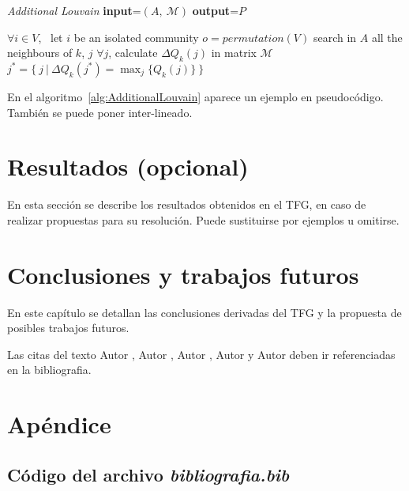 \documentclass[twoside]{tfg-urjc}
\begin{document}
\begin{algorithm}[t]
  \caption{\textit{Additional Louvain} \textbf{input}=$\left(A, \ \mathcal{M}\right)$ \textbf{output}=$P$}
  \begin{algorithmic}[1]
    \STATE $\forall i \in V$, \ let $i$ be an isolated community
    \STATE $o=permutation(V)$
    \STATE search in $A$ all the neighbours of $k$, $j$
    \STATE $\forall j$, calculate $\Delta Q_k(j)$ in matrix $\mathcal{M}$
    \STATE $j^*=\{ \ j \ | \ \Delta Q_k(j^*)=\max_j\{Q_k(j)\} \ \}$
    \ELSE
    \ENDIF
    \ENDFOR
  \end{algorithmic}
  \label{alg:AdditionalLouvain}
\end{algorithm}


En el algoritmo~\ref{alg:AdditionalLouvain} aparece un ejemplo en
pseudocódigo.  También se puede poner  inter-lineado.


\chapter{Resultados (opcional)}
\label{sec:resulObtenidos}


En esta sección se describe los resultados obtenidos en el TFG, en
caso de realizar propuestas para su resolución. Puede sustituirse por
ejemplos u omitirse.


\chapter{Conclusiones y trabajos futuros}

En este capítulo se detallan las conclusiones derivadas del TFG y la
propuesta de posibles trabajos futuros.

Las citas del texto Autor \cite{giaquinta}, Autor \cite{fortune},
Autor \cite{fortuneB}, Autor \cite{mitchell} y Autor \cite{morrey}
deben ir referenciadas en la bibliografia.



\cleardoublepage
{}
{}

\printbibliography


\cleardoublepage
\appendix

\chapter{Apéndice}


\section{Código del archivo \emph{bibliografia.bib}}
\label{app:bib}


\end{document}
